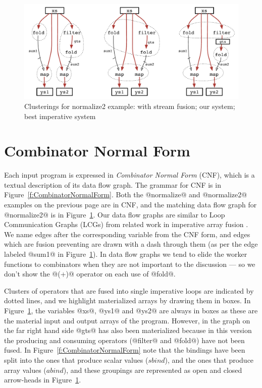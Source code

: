 
\begin{figure}[ht!]
\begin{center}
\includegraphics[scale=0.5]{figures/ex1-compare.pdf}
\end{center}
\caption{Clusterings for normalize2 example: with stream fusion; our system; best imperative system}
\label{f:normalize2-clusterings}
\end{figure}


\section{Combinator Normal Form}
Each input program is expressed in \emph{Combinator Normal Form} (CNF), which is a textual description of its data flow graph. The grammar for CNF is in Figure~\ref{f:CombinatorNormalForm}. Both the @normalize@ and @normalize2@ examples on the previous page are in CNF, and the matching data flow graph for @normalize2@ is in Figure~\ref{f:normalize2-clusterings}. Our data flow graphs are similar to Loop Communication Graphs (LCGs) from related work in imperative array fusion \CITE. We name edges after the corresponding variable from the CNF form, and edges which are fusion preventing are drawn with a dash through them (as per the edge labeled @sum1@ in Figure~\ref{f:normalize2-clusterings}). In data flow graphs we tend to elide the worker functions to combinators when they are not important to the discussion --- so we don't show the @(+)@ operator on each use of @fold@.

Clusters of operators that are fused into single imperative loops are indicated by dotted lines, and we highlight materialized arrays by drawing them in boxes. In Figure~\ref{f:normalize2-clusterings}, the variables @xs@, @ys1@ and @ys2@ are always in boxes as these are the material input and output arrays of the program. However, in the graph on the far right hand side @gts@ has also been materialized because in this version the producing and consuming operators (@filter@ and @fold@) have not been fused. In Figure~\ref{f:CombinatorNormalForm} note that the bindings have been split into the ones that produce scalar values ($sbind$), and the ones that produce array values ($abind$), and these groupings are represented as open and closed arrow-heads in Figure~\ref{f:normalize2-clusterings}.

